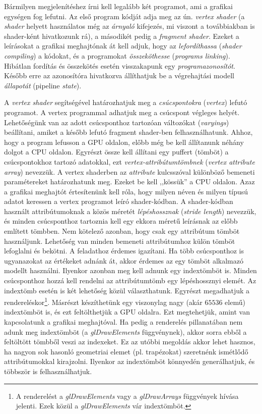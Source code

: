\documentclass[12pt]{report}
\theoremstyle{definition}
\newcommand{\inenglish}[1]{\textsl{#1}}
\newcommand{\func}[1]{{\textsl{#1}}}
\begin{document}
Bármilyen megjelenítéshez írni kell legalább két programot, ami a grafikai
egységen fog lefutni. Az első program kódját adja meg az ún. \emph{vertex
shader} (a \inenglish{shader} helyett használatos még az \emph{árnyaló}
kifejezés, mi viszont a továbbiakban is shader-ként hivatkozunk rá), a
másodikét pedig a \emph{fragment shader}. Ezeket a leírásokat a grafikai
meghajtónak át kell adjuk, hogy az \emph{lefordíthassa} (\inenglish{shader
compiling}) a kódokat, és a programokat \emph{összeköthesse}
(\inenglish{programs linking}). Hibátlan fordítás és összekötés esetén
visszakapunk egy \emph{programazonosítót}. Később erre az azonosítóra
hivatkozva állíthatjuk be a végrehajtási modell \emph{állapotát} (pipeline
\inenglish{state}).

A \emph{vertex shader} segítségével határozhatjuk meg a \emph{csúcspontokra}
(\inenglish{vertex}) lefutó programot. A vertex programmal adhatjuk meg a
csúcspont végleges helyét.  Lehetőségünk van az adott csúcsponthoz tartozóan
változókat (\inenglish{varyings}) beállítani, amiket a később lefutó fragment
shader-ben felhasználhatunk. Ahhoz, hogy a program lefusson a GPU oldalon,
előbb még be kell állítanunk néhány dolgot a CPU oldalon. Egyrészt össze kell
állítani egy puffert (tömböt) a csúcspontokhoz tartozó adatokkal, ezt
\emph{vertex-attribútumtömbnek} (\inenglish{vertex attribute array}) nevezzük.
A vertex shaderben az \func{attribute} kulcsszóval különböző bemeneti
paramétereket határozhatunk meg. Ezeket be kell ,,kössük'' a CPU oldalon. Azaz
a grafikai meghajtót értesítenünk kell róla, hogy milyen néven és milyen típusú
adatot keressen a vertex programot leíró shader-kódban. A shader-kódban
használt attribútumoknak a közös méretét \emph{lépéshossznak}
(\inenglish{stride length}) nevezzük, és minden csúcsponthoz tartoznia kell egy
ekkora méretű leírásnak az előbb említett tömbben. Nem kötelező azonban, hogy
csak egy attribútum tömböt használjunk. Lehetőség van minden bemeneti
attribútumhoz külön tömböt lefoglalni és bekötni. A feladathoz érdemes
igazítani. Ha több csúcsponthoz is ugyanazokat az értékeket adnánk át, akkor
érdemes az egy tömböt alkalmazó modellt használni. Ilyenkor azonban meg kell
adnunk egy indextömböt is. Minden csúcsponthoz hozzá kell rendelni az
attribútumtömb egy lépéshossznyi elemét. Az indextömb esetén is két lehetőség
közül választhatunk. Egyrészt megadhatjuk a rendereléskor\footnote{A
renderelést a \func{glDrawElements} vagy a \func{glDrawArrays} függvények
hívása jelenti. Ezek közül a \func{glDrawElements} vár indextömböt.}. Másrészt
készíthetünk egy viszonylag nagy (akár $65536$ elemű) indextömböt is, és ezt
feltölthetjük a GPU oldalra. Ezt megtehetjük, amint van kapcsolatunk a grafikai
meghajtóval. Ha pedig a renderelés pillanatában nem adunk meg indextömböt (a
\func{glDrawElements} függvénynek), akkor sorra ebből a feltöltött tömbből
veszi az indexeket. Ez az utóbbi megoldás akkor lehet hasznos, ha nagyon sok
hasonló geometriai elemet (pl. trapézokat) szeretnénk ismétlődő attribútumokkal
kirajzolni. Ilyenkor az indextömböt könnyedén generálhatjuk, és többször is
felhasználhatjuk.
\end{document}
